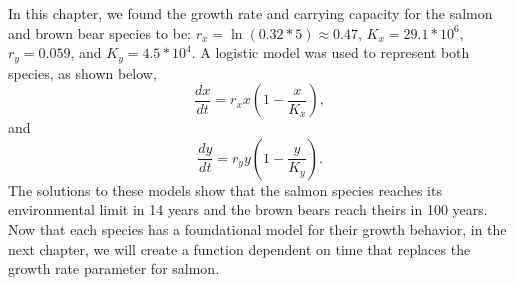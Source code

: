 In this chapter, we found the growth rate and carrying capacity for the salmon and brown bear species to be: $r_x=\ln(0.32*5)\approx0.47$, $K_x=29.1*10^6$, $r_y=0.059$, and $K_y=4.5*10^{4}$.
A logistic model was used to represent both species, as shown below,
\begin{equation*}
    \frac{dx}{dt} = r_xx\left(1-\frac{x}{K_x}\right),
\end{equation*}
and
\begin{equation*}
    \frac{dy}{dt} = r_yy\left(1-\frac{y}{K_y}\right).
\end{equation*}
The solutions to these models show that the salmon species reaches its environmental limit in 14 years and the brown bears reach theirs in 100 years.
Now that each species has a foundational model for their growth behavior, in the next chapter, we will create a function dependent on time that replaces the growth rate parameter for salmon.